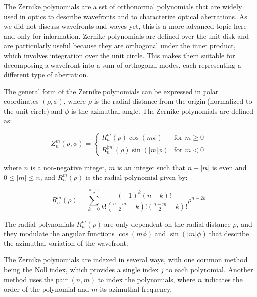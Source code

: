 \documentclass[
  a4paper,
]{book}
\begin{document}
\begin{tcolorbox}[enhanced jigsaw, coltitle=black, title=\textcolor{quarto-callout-note-color}{\faInfo}\hspace{0.5em}{Aberration Characterization and Zernike Polynomials}, colframe=quarto-callout-note-color-frame, toprule=.15mm, opacitybacktitle=0.6, left=2mm, opacityback=0, breakable, toptitle=1mm, bottomtitle=1mm, leftrule=.75mm, arc=.35mm, titlerule=0mm, colbacktitle=quarto-callout-note-color!10!white, rightrule=.15mm, bottomrule=.15mm, colback=white]

The Zernike polynomials are a set of orthonormal polynomials that are
widely used in optics to describe wavefronts and to characterize optical
aberrations. As we did not discuss wavefronts and waves yet, this is a
more advanced topic here and only for information. Zernike polynomials
are defined over the unit disk and are particularly useful because they
are orthogonal under the inner product, which involves integration over
the unit circle. This makes them suitable for decomposing a wavefront
into a sum of orthogonal modes, each representing a different type of
aberration.

The general form of the Zernike polynomials can be expressed in polar
coordinates \((\rho, \phi)\), where \(\rho\) is the radial distance from
the origin (normalized to the unit circle) and \(\phi\) is the azimuthal
angle. The Zernike polynomials are defined as:

\[
Z_n^m(\rho, \phi) =
\begin{cases}
R_n^m(\rho) \cos(m\phi) & \text{for } m \geq 0 \\
R_n^{|m|}(\rho) \sin(|m|\phi) & \text{for } m < 0
\end{cases}
\]

where \(n\) is a non-negative integer, \(m\) is an integer such that
\(n - |m|\) is even and \(0 \leq |m| \leq n\), and \(R_n^m(\rho)\) is
the radial polynomial given by:

\[
R_n^m(\rho) = \sum_{k=0}^{\frac{n-m}{2}} \frac{(-1)^k (n-k)!}{k! \left(\frac{n+m}{2} - k\right)! \left(\frac{n-m}{2} - k\right)!} \rho^{n-2k}
\]

The radial polynomials \(R_n^m(\rho)\) are only dependent on the radial
distance \(\rho\), and they modulate the angular functions
\(\cos(m\phi)\) and \(\sin(|m|\phi)\) that describe the azimuthal
variation of the wavefront.

The Zernike polynomials are indexed in several ways, with one common
method being the Noll index, which provides a single index \(j\) to each
polynomial. Another method uses the pair \((n, m)\) to index the
polynomials, where \(n\) indicates the order of the polynomial and \(m\)
its azimuthal frequency.


\end{tcolorbox}
\end{document}
